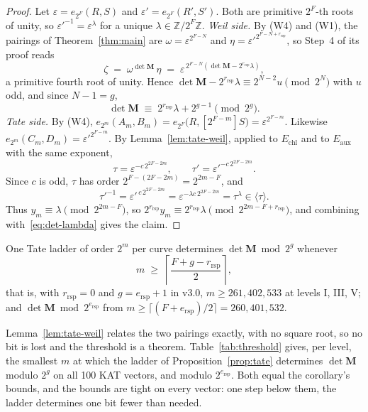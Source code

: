 \documentclass[version=submission]{iacrcc}
\newcommand{\ers}{e_{\mathrm{rsp}}}
\newcommand{\rrs}{r_{\mathrm{rsp}}}
\newcommand{\Mm}{\mathbf{M}}
\begin{document}
\begin{proof}
Let $\varepsilon = e_{2^F}(R,S)$ and $\varepsilon' = e_{2^F}(R',S')$. Both are primitive
$2^F$-th roots of unity, so $\varepsilon'^{-1} = \varepsilon^{\lambda}$ for a unique
$\lambda \in \mathbb{Z}/2^F\mathbb{Z}$.
\emph{Weil side.} By (W4) and (W1), the pairings of Theorem~\ref{thm:main} are
$\omega = \varepsilon^{2^{F-N}}$ and $\eta = \varepsilon'^{2^{F-N+\rrs}}$, so
Step~4 of its proof reads
\[
  \zeta \;=\; \omega^{\det \Mm}\,\eta
  \;=\; \varepsilon^{\,2^{F-N}\left(\det \Mm - 2^{\rrs}\lambda\right)} ,
\]
a primitive fourth root of unity. Hence
$\det \Mm - 2^{\rrs}\lambda \equiv 2^{N-2} u \pmod{2^N}$ with $u$ odd, and since
$N - 1 = g$,
\begin{equation}\label{eq:det-lambda}
  \det \Mm \;\equiv\; 2^{\rrs}\lambda + 2^{g - 1} \pmod{2^{g}} .
\end{equation}
\emph{Tate side.} By (W4), $e_{2^m}(A_m,B_m) = e_{2^F}\bigl(R, [2^{F-m}]S\bigr)
= \varepsilon^{2^{F-m}}$. Likewise $e_{2^m}(C_m,D_m) = \varepsilon'^{2^{F-m}}$. By
Lemma~\ref{lem:tate-weil}, applied to $E_{\mathrm{chl}}$ and to $E_{\mathrm{aux}}$ with the
same exponent,
\[
  \tau = \varepsilon^{-c\,2^{2F-2m}}, \qquad \tau' = \varepsilon'^{-c\,2^{2F-2m}} .
\]
Since $c$ is odd, $\tau$ has order $2^{F-(2F-2m)} = 2^{2m-F}$, and
\[
  \tau'^{-1} = \varepsilon'^{\,c\,2^{2F-2m}}
  = \varepsilon^{-\lambda c\, 2^{2F-2m}} = \tau^{\lambda} \in \langle \tau \rangle .
\]
Thus $y_m \equiv \lambda \pmod{2^{2m-F}}$, so
$2^{\rrs} y_m \equiv 2^{\rrs}\lambda
\pmod{2^{2m-F+\rrs}}$, and combining with~\eqref{eq:det-lambda} gives the claim.
\end{proof}

\begin{corollary}\label{cor:tate-threshold}
One Tate ladder of order $2^m$ per curve determines $\det \Mm \bmod 2^g$ whenever
\[
  m \;\ge\; \left\lceil \frac{F + g - \rrs}{2} \right\rceil ,
\]
that is, with $\rrs = 0$ and $g = \ers + 1$ in v3.0, $m \ge 261, 402,
533$ at levels I, III, V; and $\det \Mm \bmod 2^{\ers}$ from $m \ge
\lceil (F + \ers)/2 \rceil = 260, 401, 532$.
\end{corollary}

Lemma~\ref{lem:tate-weil} relates the two pairings exactly, with no square
root, so no bit is lost and the threshold is a theorem.
Table~\ref{tab:threshold} gives, per level, the smallest $m$ at which the
ladder of Proposition~\ref{prop:tate} determines $\det \Mm$ modulo $2^g$
on all 100 KAT vectors, and modulo $2^{\ers}$. Both equal the corollary's bounds, and the bounds are tight on every vector: one step below them, the ladder determines one bit fewer than needed.
\end{document}
